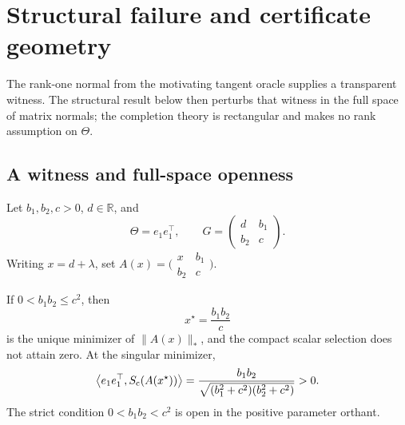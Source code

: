\section{Structural failure and certificate geometry}
\label{sec:failure}

The rank-one normal from the motivating tangent oracle supplies a transparent
witness.  The structural result below then perturbs that witness in the full
space of matrix normals; the completion theory is rectangular and makes no
rank assumption on \(\Theta\).

\subsection{A witness and full-space openness}

Let \(b_1,b_2,c>0\), \(d\in\mathbb R\), and
\begin{equation}
 \Theta=e_1e_1^\top,
 \qquad
 G=\begin{pmatrix}d&b_1\\b_2&c\end{pmatrix}.
 \label{eq:2by2-data}
\end{equation}
Writing \(x=d+\lambda\), set
\(A(x)=\bigl(\begin{smallmatrix}x&b_1\\b_2&c\end{smallmatrix}\bigr)\).

\begin{theorem}
\label{thm:open-2by2}
If \(0<b_1b_2\le c^2\), then
\begin{equation}
 x^\star=\frac{b_1b_2}{c}
 \label{eq:2by2-minimizer}
\end{equation}
is the unique minimizer of \(\|A(x)\|_*\), and the compact scalar selection
does not attain zero.  At the singular minimizer,
\begin{equation}
 \left\langle e_1e_1^\top,S_{\mathrm c}(A(x^\star))\right\rangle
 =\frac{b_1b_2}{\sqrt{(b_1^2+c^2)(b_2^2+c^2)}}>0.
 \label{eq:2by2-jump}
\end{equation}
The strict condition \(0<b_1b_2<c^2\) is open in the positive parameter orthant.
\end{theorem}

